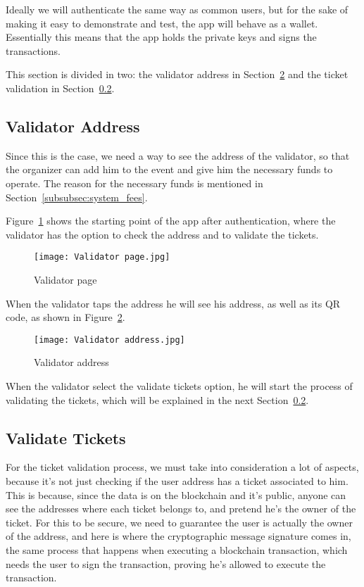 Ideally we will authenticate the same way as common users, but for the sake of
making it easy to demonstrate and test, the app will behave as a wallet.
Essentially this means that the app holds the private keys and signs the
transactions.

This section is divided in two: the validator address in
Section~\ref{fig:validator_address} and the ticket validation in
Section~\ref{subsec:validate_tickets}.

\subsection{Validator Address}\label{subsec:validator_address}

Since this is the case, we need a way to see the address of the validator, so
that the organizer can add him to the event and give him the necessary funds to
operate. The reason for the necessary funds is mentioned in
Section~\ref{subsubsec:system_fees}.

Figure~\ref{fig:validator_page} shows the starting point of the app after
authentication, where the validator has the option to check the address and to
validate the tickets.

\begin{figure}[H]
	\texttt{[image: Validator page.jpg]}
	\centering
	\caption{Validator page}\label{fig:validator_page}
\end{figure}

When the validator taps the address he will see his address, as well as its QR
code, as shown in Figure~\ref{fig:validator_address}.

\begin{figure}[H]
	\texttt{[image: Validator address.jpg]}
	\centering
	\caption{Validator address}\label{fig:validator_address}
\end{figure}

When the validator select the validate tickets option, he will start the
process of validating the tickets, which will be explained in the next
Section~\ref{subsec:validate_tickets}.

\subsection{Validate Tickets}\label{subsec:validate_tickets}

For the ticket validation process, we must take into consideration a lot of
aspects, because it's not just checking if the user address has a ticket
associated to him. This is because, since the data is on the blockchain and
it's public, anyone can see the addresses where each ticket belongs to, and
pretend he's the owner of the ticket. For this to be secure, we need to
guarantee the user is actually the owner of the address, and here is where the
cryptographic message signature comes in, the same process that happens when
executing a blockchain transaction, which needs the user to sign the
transaction, proving he's allowed to execute the transaction.

